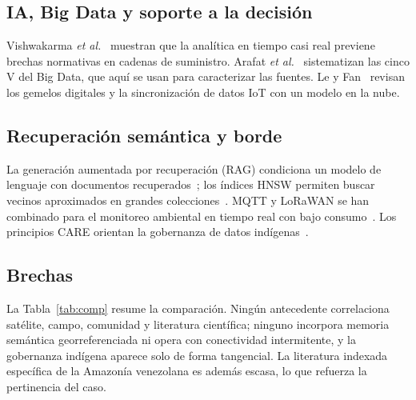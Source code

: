 \documentclass[conference]{IEEEtran}
\begin{document}
\subsection{IA, Big Data y soporte a la decisión}
Vishwakarma \emph{et al.}~\cite{vishwakarma2025} muestran que la analítica en tiempo casi real previene brechas normativas en cadenas de suministro. Arafat \emph{et al.}~\cite{arafat2025} sistematizan las cinco V del Big Data, que aquí se usan para caracterizar las fuentes. Le y Fan~\cite{le2024} revisan los gemelos digitales y la sincronización de datos IoT con un modelo en la nube.

\subsection{Recuperación semántica y borde}
La generación aumentada por recuperación (RAG) condiciona un modelo de lenguaje con documentos recuperados~\cite{lewis2020,gao2023}; los índices HNSW permiten buscar vecinos aproximados en grandes colecciones~\cite{malkov2020}. MQTT y LoRaWAN se han combinado para el monitoreo ambiental en tiempo real con bajo consumo~\cite{rosli2020}. Los principios CARE orientan la gobernanza de datos indígenas~\cite{carroll2020}.

\subsection{Brechas}
La Tabla~\ref{tab:comp} resume la comparación. Ningún antecedente correlaciona satélite, campo, comunidad y literatura científica; ninguno incorpora memoria semántica georreferenciada ni opera con conectividad intermitente, y la gobernanza indígena aparece solo de forma tangencial. La literatura indexada específica de la Amazonía venezolana es además escasa, lo que refuerza la pertinencia del caso.
\end{document}
